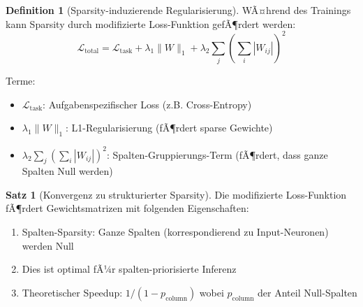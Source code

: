 ﻿\documentclass[a4paper,12pt]{report}
\theoremstyle{definition}
\newtheorem{definition}{Definition}
\newtheorem{satz}{Satz}
\begin{document}
	\begin{definition}[Sparsity-induzierende Regularisierung]
		WÃ¤hrend des Trainings kann Sparsity durch modifizierte Loss-Funktion gefÃ¶rdert werden:
		\[
		\mathcal{L}_{\text{total}} = \mathcal{L}_{\text{task}} + \lambda_1 \|W\|_1 + \lambda_2 \sum_{j} \left(\sum_i |W_{ij}|\right)^2
		\]
		
		Terme:
		\begin{itemize}
			\item $\mathcal{L}_{\text{task}}$: Aufgabenspezifischer Loss (z.B. Cross-Entropy)
			\item $\lambda_1 \|W\|_1$: L1-Regularisierung (fÃ¶rdert sparse Gewichte)
			\item $\lambda_2 \sum_{j} (\sum_i |W_{ij}|)^2$: Spalten-Gruppierungs-Term (fÃ¶rdert, dass ganze Spalten Null werden)
		\end{itemize}
	\end{definition}
	
	\begin{satz}[Konvergenz zu strukturierter Sparsity]
		Die modifizierte Loss-Funktion fÃ¶rdert Gewichtsmatrizen mit folgenden Eigenschaften:
		\begin{enumerate}
			\item Spalten-Sparsity: Ganze Spalten (korrespondierend zu Input-Neuronen) werden Null
			\item Dies ist optimal fÃ¼r spalten-priorisierte Inferenz
			\item Theoretischer Speedup: $1 / (1 - p_{\text{column}})$ wobei $p_{\text{column}}$ der Anteil Null-Spalten
		\end{enumerate}
	\end{satz}
	
\end{document}
